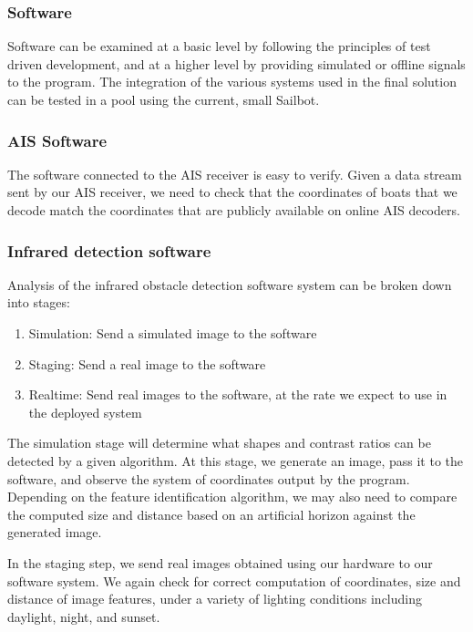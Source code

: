 \subsubsection{\label{sec:method:proposed-analysis:software}Software}
Software can be examined at a basic level by following the principles of test driven development, and at a higher level by providing simulated or offline signals to the program. The integration of the various systems used in the final solution can be tested in a pool using the current, small Sailbot.

\subsubsection{\label{sec:method:proposed-analysis:ais-software}AIS Software}

The software connected to the AIS receiver is easy to verify. Given a data stream sent by our AIS receiver, we need to check that the coordinates of boats that we decode match the coordinates that are publicly available on online AIS decoders.

\subsubsection{\label{sec:method:proposed-analysis:infrared-software}Infrared detection software}

Analysis of the infrared obstacle detection software system can be broken down into stages:
\begin{enumerate}
\item Simulation: Send a simulated image to the software
\item Staging: Send a real image to the software
\item Realtime: Send real images to the software, at the rate we expect to use in the deployed system
\end{enumerate}

The simulation stage will determine what shapes and contrast ratios can be detected by a given algorithm. At this stage, we generate an image, pass it to the software, and observe the system of coordinates output by the program. Depending on the feature identification algorithm, we may also need to compare the computed size and distance based on an artificial horizon against the generated image.

In the staging step, we send real images obtained using our hardware to our software system. We again check for correct computation of coordinates, size and distance of image features, under a variety of lighting conditions including daylight, night, and sunset.

